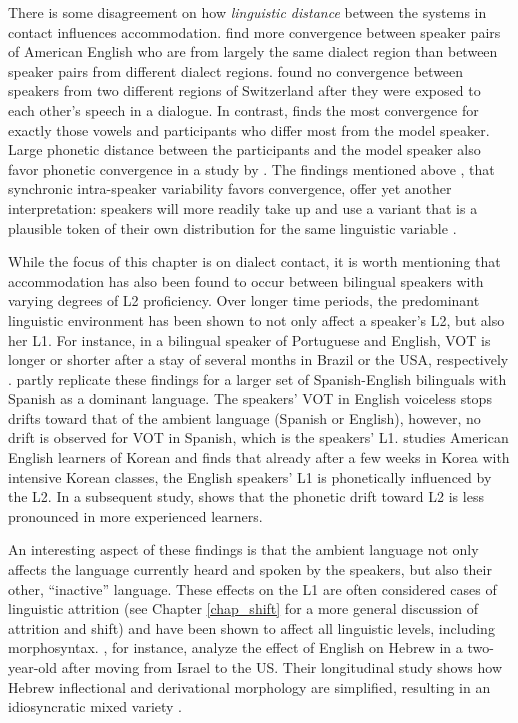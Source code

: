 \documentclass[output=paper]{langscibook}
\begin{document}
There is some disagreement on how \textit{linguistic distance} between the systems in contact influences accommodation. \textcite{kim_phonetic_2011} find more convergence between speaker pairs of American English who are from largely the same dialect region than between speaker pairs from different dialect regions. \textcite{ruch2021dialect} found no convergence between speakers from two different regions of Switzerland after they were exposed to each other's speech in a dialogue. 
In contrast, \textcite{babel_evidence_2012} finds the most convergence for exactly those vowels and participants who differ most from the model speaker. Large phonetic distance between the participants and the model speaker also favor phonetic convergence in a study by \textcite{walker_repeat_2015}. The findings mentioned above \parencites{bowie_effect_2000}{watt_levels_2010}{beckner_participants_2016}, that synchronic intra-speaker variability favors convergence, offer yet another interpretation: speakers will more readily take up and use a variant that is a plausible token of their own distribution for the same linguistic variable \citep[for evidence from an agent-based model, see][]{harrington_/u/-fronting_2017}. 

While the focus of this chapter is on dialect contact, it is worth mentioning that accommodation has also been found to occur between bilingual speakers with varying degrees of L2 proficiency. Over longer time periods, the predominant linguistic environment has been shown to not only affect a speaker's L2, but also her L1. For instance, in a bilingual speaker of Portuguese and English, VOT is longer or shorter after a stay of several months in Brazil or the USA, respectively \citep{sancier_gestural_1997}. \citet{tobin_phonetic_2017} partly replicate these findings for a larger set of Spanish-English bilinguals with Spanish as a dominant language. The speakers' VOT in English voiceless stops drifts toward that of the ambient language (Spanish or English), however, no drift is observed for VOT in Spanish, which is the speakers' L1. \textcite{chang_rapid_2012} studies American English learners of Korean and finds that already after a few weeks in Korea with intensive Korean classes, the English speakers' L1 is phonetically influenced by the L2. In a subsequent study, \textcite{chang_novelty_2013} shows that the phonetic drift toward L2 is less pronounced in more experienced learners.

An interesting aspect of these findings is that the ambient language not only affects the language currently heard and spoken by the speakers, but also their other, ``inactive'' language. These effects on the L1 are often considered cases of linguistic attrition (see Chapter \ref{chap_shift} for a more general discussion of attrition and shift) and have been shown to affect all linguistic levels, including morphosyntax. \citet{kaufman_morphological_1991}, for instance, analyze the effect of English on Hebrew in a two-year-old after moving from Israel to the US. Their longitudinal study shows how Hebrew inflectional and derivational morphology are simplified, resulting in an idiosyncratic mixed variety \citep{kaufman_morphological_1991}.
\end{document}
